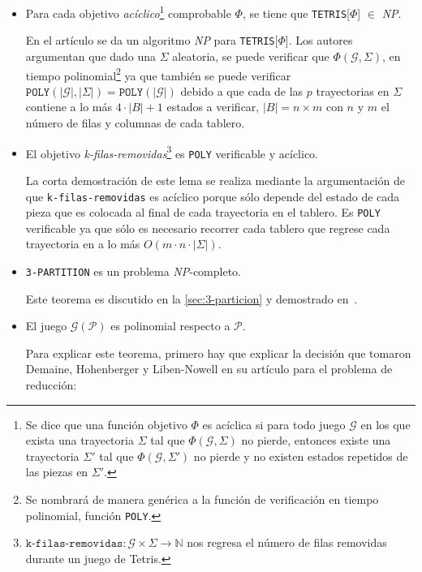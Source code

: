 \begin{itemize}[leftmargin=0.5cm,align=left]

\item[\textbf{Teorema 2.1}] Para cada objetivo \textit{acíclico}\footnote{Se dice que una
función objetivo $\Phi$ es acíclica si para todo juego $\mathcal{G}$ en los que 
exista una trayectoria $\Sigma$ tal que $\Phi(\mathcal{G},\Sigma)$ no
pierde, entonces existe una trayectoria $\Sigma'$ tal que
$\Phi(\mathcal{G},\Sigma')$ no pierde y no existen estados repetidos de
las piezas en $\Sigma'$.} comprobable $\Phi$, se tiene
que \texttt{TETRIS}[$\Phi$] $\in$ \textsl{NP}.

En el artículo se da un algoritmo \textsl{NP} para \texttt{TETRIS}[$\Phi$]. Los autores
argumentan que dado una $\Sigma$ aleatoria, se puede verificar que
$\Phi(\mathcal{G}, \Sigma)$, en tiempo polinomial\footnote{Se nombrará de
manera genérica a la función de verificación en tiempo polinomial, función
\texttt{POLY}.}  ya que también se puede verificar
$\texttt{POLY}(|\mathcal{G}|, |\Sigma|) = \texttt{POLY}(|\mathcal{G}|)$
debido a que cada de las $p$ trayectorias en $\Sigma$ contiene a lo más
$4 \cdot |B| + 1$ estados a verificar, $|B| = n\times m$ con $n$ y $m$ el número de filas
y columnas de cada tablero.

\item[\textbf{Lema 2.2}] El objetivo \textit{k-filas-removidas}\footnote{
$\texttt{k-filas-removidas}:\mathcal{G} \times \Sigma \rightarrow \mathds{N}$
nos regresa el número de filas removidas durante un juego de Tetris.} es
\texttt{POLY} verificable y acíclico.

La corta demostración de este lema se realiza mediante la argumentación
de que \texttt{k-filas-removidas} es acíclico porque sólo depende del estado
de cada pieza que es colocada al final de cada trayectoria en el tablero.
Es \texttt{POLY} verificable ya que sólo es necesario recorrer cada tablero que
regrese cada trayectoria en a lo más $O(m \cdot n \cdot |\Sigma|)$.

\item[\textbf{Teorema 3.1}] \texttt{3-PARTITION} es un problema \textsl{NP}-completo.

Este teorema es discutido en la \cref{sec:3-particion} y demostrado
en~\cite{Garey:1990:CIG:574848}.

\item[\textbf{Teorema 3.2}] El juego $\mathcal{G}(\mathcal{P})$ es polinomial
respecto a $\mathcal{P}$.

Para explicar este teorema, primero hay que explicar la decisión que tomaron
Demaine,  Hohenberger y Liben-Nowell en su artículo para el problema de reducción:


\end{itemize}
